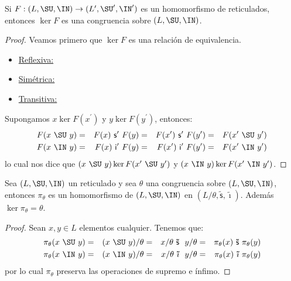   \begin{lemma}
    \PN Si $F: (L, \SU, \IN) \rightarrow (L^{\prime}, \SU^{\prime}, \IN^{\prime})$ es un homomorfismo de reticulados,
    entonces $\ker F$ es una congruencia sobre $(L, \SU, \IN)$.
  \end{lemma}
  \begin{proof}
    \PN Veamos primero que $\ker F$ es una relación de equivalencia.
    \begin{itemize}
      \item \underline{Reflexiva:}
      \item \underline{Simétrica:}
      \item \underline{Transitiva:}
      \end{itemize}

    \PN Supongamos $x \ker F(x^{\prime})$ y $y \ker F(y^{\prime})$, entonces:
    \begin{alignat*}{4}
      F(x \ \SU \ y) &=& F(x) \ \mathsf{s^{\prime}} \ F(y) &=& F(x^{\prime}) \ \mathsf{s^{\prime}} \ F(y^{\prime}) &=&
        F(x^{\prime} \ \SU \ y^{\prime}) \\
      F(x \ \IN \ y) &=& F(x) \ \mathsf{i^{\prime}} \ F(y) &=& F(x^{\prime}) \ \mathsf{i^{\prime}} \ F(y^{\prime}) &=&
        F(x^{\prime} \ \IN \ y^{\prime}) \\
    \end{alignat*}
    \PN lo cual nos dice que $(x \ \SU \ y) \ker F(x^{\prime} \ \SU \ y^{\prime})$ y $(x \ \IN \ y) \ker F(x^{\prime} \
    \IN \ y^{\prime})$.
  \end{proof}

  \begin{lemma}
    \PN Sea $(L, \SU, \IN)$ un reticulado y sea $\theta$ una congruencia sobre $(L, \SU, \IN)$, entonces $\pi_{\theta}$
    es un homomorfismo de $(L, \SU, \IN)$ en $(L/\theta, \mathsf{\tilde{s}}, \mathsf{\tilde{\imath}})$. Además $\ker
    \pi_{\theta} = \theta$.
  \end{lemma}
  \begin{proof}
    \PN Sean $x, y \in L$ elementos cualquier. Tenemos que:
      \begin{alignat*}{4}
        \pi_{\theta}(x \ \SU \ y) &=& (x \ \SU \ y)/\theta &=& x/\theta \ \mathsf{\tilde{s}} \ y/\theta &=&
          \pi_{\theta}(x) \ \mathsf{\tilde{s}} \ \pi_{\theta}(y) \\
        \pi_{\theta}(x \ \IN \ y) &=& (x \ \IN \ y)/\theta &=& x/\theta \ \mathsf{\tilde{\imath}} \ y/\theta &=&
          \pi_{\theta}(x) \ \mathsf{\tilde{\imath}} \ \pi_{\theta}(y) \\
      \end{alignat*}
    \PN por lo cual $\pi_{\theta}$ preserva las operaciones de supremo e ínfimo.
  \end{proof}

